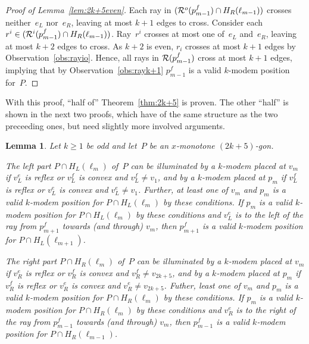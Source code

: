 \documentclass[A4]{article}
\newtheorem{lemma}[theorem]{Lemma}
\begin{document}
\begin{proof}[Proof of Lemma~\ref{lem:2k+5even}]
Each ray in $( {\cal R}^o(p^f_{m-1})\cap H_R(\ell_{m-1}) )$ crosses neither~$e_L$ nor~$e_R$, leaving at most $k+1$ edges to cross.
Consider each $r^i\in( {\cal R}^i(p^f_{m-1})\cap H_R(\ell_{m-1}) )$.
Ray~$r^i$ crosses at most one of~$e_L$ and~$e_R$, leaving at most $k+2$ edges to cross.
As $k+2$ is even, $r_i$ crosses at most $k+1$ edges by Observation~\ref{obs:rayio}.
Hence, all rays in ${\cal R}(p^f_{m-1})$ cross at most $k+1$ edges, implying that by Observation~\ref{obs:rayk+1} $p^f_{m-1}$ is a valid \mbox{$k$-modem} position for~$P$.
\end{proof}


With this proof, ``half of'' Theorem~\ref{thm:2k+5} is proven.
The other ``half'' is shown in the next two proofs, which have of the same structure as the two preceeding ones, but need slightly more involved arguments.


\begin{lemma}\label{lem:2k+5subodd}
Let $k\geq1$ be odd and let~$P$ be an $x$-monotone $(2k+5)$-gon.

The left part $P\cap H_L(\ell_{m})$ of~$P$ can be illuminated by a \mbox{$k$-modem} placed
at $v_m$ if $v^e_L$ is reflex or $v^f_L$ is convex and $v^f_L\neq v_1$, and by a \mbox{$k$-modem} placed
at $p_m$ if $v^f_L$ is reflex or $v^e_L$ is convex and $v^e_L\neq v_1$.
Further, at least one of $v_m$ and $p_m$ is a valid \mbox{$k$-modem} position for $P\cap H_L(\ell_{m})$ by these conditions.
If $p_m$ is a valid \mbox{$k$-modem} position for $P\cap H_L(\ell_{m})$ by these conditions and $v^e_L$ is to the left of the ray from $p^f_{m+1}$ towards (and through) $v_m$, then $p^f_{m+1}$ is a valid \mbox{$k$-modem} position for $P\cap H_L(\ell_{m+1})$.


The right part $P\cap H_R(\ell_{m})$ of~$P$ can be illuminated by a \mbox{$k$-modem} placed
at $v_m$ if $v^e_R$ is reflex or $v^f_R$ is convex and $v^f_R\neq v_{2k+5}$, and by a \mbox{$k$-modem} placed
at $p_m$ if $v^f_R$ is reflex or $v^e_R$ is convex and $v^e_R\neq v_{2k+5}$.
Futher, least one of $v_m$ and $p_m$ is a valid \mbox{$k$-modem} position for $P\cap H_R(\ell_{m})$ by these conditions.
If $p_m$ is a valid \mbox{$k$-modem} position for $P\cap H_R(\ell_{m})$ by these conditions and $v^e_R$ is to the right of the ray from $p^f_{m-1}$ towards (and through) $v_m$, then $p^f_{m-1}$ is a valid \mbox{$k$-modem} position for $P\cap H_R(\ell_{m-1})$.
\end{lemma}
\end{document}

